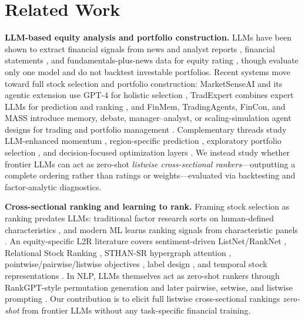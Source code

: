 \section{Related Work}

\textbf{LLM-based equity analysis and portfolio construction.}
LLMs have been shown to extract financial signals from news and analyst reports \citep{lopez2023chatgpt,kim2023llmanalysts}, financial statements \citep{kim2024llmforecast}, and fundamentals-plus-news data for equity rating \citep{papasotiriou2024ai}, though \citeauthor{papasotiriou2024ai} evaluate only one model and do not backtest investable portfolios.
Recent systems move toward full stock selection and portfolio construction: MarketSenseAI and its agentic extension use GPT-4 for holistic selection \citep{fatouros2024marketsenseai,fatouros2025marketsenseai2}, TradExpert combines expert LLMs for prediction and ranking \citep{ding2025tradexpert}, and FinMem, TradingAgents, FinCon, and MASS introduce memory, debate, manager--analyst, or scaling-simulation agent designs for trading and portfolio management \citep{yu2025finmem,xiao2024tradingagents,yu2024fincon,guo2025mass}.
Complementary threads study LLM-enhanced momentum \citep{anic2025chatgpt}, region-specific prediction \citep{tan2024llmchina}, exploratory portfolio selection \citep{xie2024wallstreetneophyte,romanko2023chatgptportfolio}, and decision-focused optimization layers \citep{hwang2025dinn}.
We instead study whether frontier LLMs can act as zero-shot \emph{listwise cross-sectional rankers}---outputting a complete ordering rather than ratings or weights---evaluated via backtesting and factor-analytic diagnostics.

\textbf{Cross-sectional ranking and learning to rank.}
Framing stock selection as ranking predates LLMs: traditional factor research sorts on human-defined characteristics \citep{fama1993common,jegadeesh1993returns}, and modern ML learns ranking signals from characteristic panels \citep{gu2020empirical,bryzgalova2025forest}.
An equity-specific L2R literature covers sentiment-driven ListNet/RankNet \citep{song2017ltrsentiment}, Relational Stock Ranking \citep{feng2018temporal}, STHAN-SR hypergraph attention \citep{sawhney2021sthan}, pointwise/pairwise/listwise objectives \citep{poh2021learning,zhang2022listwise}, label design \citep{hwang2023stoploss}, and temporal stock representations \citep{hwang2024simstock}.
In NLP, LLMs themselves act as zero-shot rankers through RankGPT-style permutation generation and later pairwise, setwise, and listwise prompting \citep{sun2023rankgpt,qin2024pairwise,zhuang2024setwise,ren2025selfcalibrated}.
Our contribution is to elicit full listwise cross-sectional rankings \emph{zero-shot} from frontier LLMs without any task-specific financial training.

